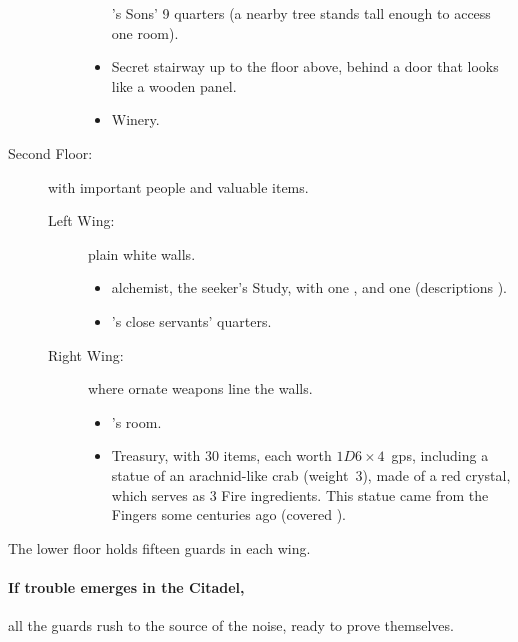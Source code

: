 \begin{multicols}{2}
\begin{description}
\begin{description}
\begin{itemize}
        's Sons' 9 quarters (a nearby tree stands tall enough to access one room).
        \item
        Secret stairway up to the floor above, behind a door that looks like a wooden panel.
        \item
        Winery.
      \end{itemize}
    \end{description}
  \item[Second Floor:]
  with important people and valuable items.
    \begin{description}
      \item[Left Wing:]
      plain white walls.
      \begin{itemize}
        \item
        \gls{alchemist}, the \gls{seeker}'s Study, with one \lootTalisman, and one \lootTalisman (descriptions ).
        \item
        's close servants' quarters.
      \end{itemize}
      \item[Right Wing:]
      where ornate weapons line the walls.
      \begin{itemize}
        \item
        's room.
        \item
        Treasury, with 30 items, each worth $1D6\times 4$~\glspl{gp}, including a statue of an arachnid-like crab (\gls{weight}~3), made of a red crystal, which serves as 3 Fire \glspl{ingredient}.
        This statue came from the Fingers some centuries ago (covered ).
      \end{itemize}
    \end{description}
\end{description}

The lower floor holds fifteen guards in each wing.


\paragraph{If trouble emerges in the Citadel,}
all the guards rush to the source of the noise, ready to prove themselves.



\end{multicols}
